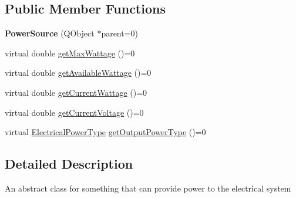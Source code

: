 \subsection*{Public Member Functions}
\begin{DoxyCompactItemize}
\item 
\hypertarget{class_challenger604_systems_1_1_power_source_a928bccc7b0f2533f4de701926747d910}{{\bfseries Power\-Source} (Q\-Object $\ast$parent=0)}\label{class_challenger604_systems_1_1_power_source_a928bccc7b0f2533f4de701926747d910}

\item 
virtual double \hyperlink{class_challenger604_systems_1_1_power_source_aed53a668295c22fabdf8adf8018d8d1d}{get\-Max\-Wattage} ()=0
\item 
virtual double \hyperlink{class_challenger604_systems_1_1_power_source_a35af892773c7a60f4d6ac031755cd104}{get\-Available\-Wattage} ()=0
\item 
virtual double \hyperlink{class_challenger604_systems_1_1_power_source_a82252be3f4e80239848bd9cadb69ec31}{get\-Current\-Wattage} ()=0
\item 
virtual double \hyperlink{class_challenger604_systems_1_1_power_source_af432be401da09206f49439f6c5299176}{get\-Current\-Voltage} ()=0
\item 
virtual \hyperlink{namespace_challenger604_systems_a9ad1a793d94b97514092692cb7315afd}{Electrical\-Power\-Type} \hyperlink{class_challenger604_systems_1_1_power_source_a005b9cac72b89344aded232d87fde2f6}{get\-Output\-Power\-Type} ()=0
\end{DoxyCompactItemize}


\subsection{Detailed Description}
An abstract class for something that can provide power to the electrical system 

